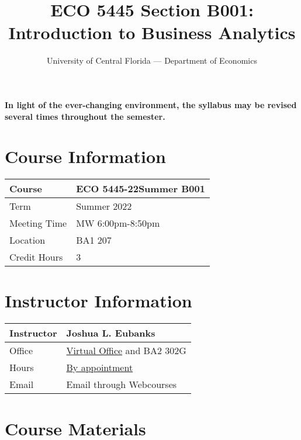 \documentclass[11pt]{paper}
\begin{document}
\title{ECO 5445 Section B001: Introduction to Business Analytics}
\author{University of Central Florida --- Department of Economics}

\maketitle
\hrulefill

\begin{flushleft}
{\color{red} \textbf{In light of the ever-changing environment, the syllabus may be revised several times throughout the semester.}}
\end{flushleft}

\section*{Course Information}
\begin{flushleft}
\begin{tabular}{| l | l |}\hline
 Course & ECO 5445-22Summer B001 \\\hline
 Term & Summer 2022 \\\hline
 Meeting Time & MW 6:00pm-8:50pm\\\hline
 Location & BA1 207\\\hline
 Credit Hours & 3 \\\hline
\end{tabular}
\end{flushleft}

\section*{Instructor Information}
\begin{flushleft}
\begin{tabular}{| l | l |}\hline
 Instructor & Joshua L. Eubanks \\\hline
 Office & \href{https://ucf.zoom.us/j/2438809427}{Virtual Office} and BA2 302G \\\hline
 Hours & \href{https://calendly.com/ucf-office-hours-jeubanks}{By appointment} \\\hline
 Email & Email through Webcourses \\\hline
\end{tabular}
\end{flushleft}


\section*{Course Materials}
 
\end{document}
